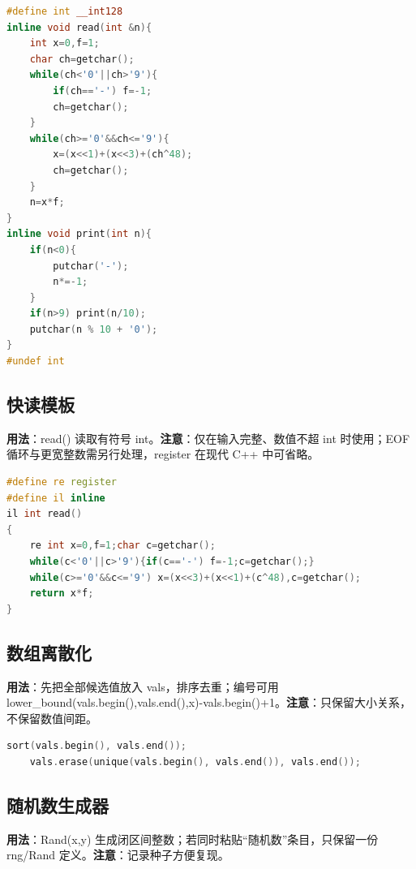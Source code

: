 \documentclass[a4paper,9pt]{extarticle}
\begin{document}
\begin{lstlisting}[language={C++}]
#define int __int128
inline void read(int &n){
    int x=0,f=1;
    char ch=getchar();
    while(ch<'0'||ch>'9'){
        if(ch=='-') f=-1;
        ch=getchar();
    }
    while(ch>='0'&&ch<='9'){
        x=(x<<1)+(x<<3)+(ch^48);
        ch=getchar();
    }
    n=x*f;
}
inline void print(int n){
    if(n<0){
        putchar('-');
        n*=-1;
    }
    if(n>9) print(n/10);
    putchar(n % 10 + '0');
}
#undef int
\end{lstlisting}

\subsection{快读模板}

\textbf{用法}：read() 读取有符号 int。\textbf{注意}：仅在输入完整、数值不超 int 时使用；EOF 循环与更宽整数需另行处理，register 在现代 C++ 中可省略。

\begin{lstlisting}[language={C++}]
#define re register
#define il inline
il int read()
{
    re int x=0,f=1;char c=getchar();
    while(c<'0'||c>'9'){if(c=='-') f=-1;c=getchar();}
    while(c>='0'&&c<='9') x=(x<<3)+(x<<1)+(c^48),c=getchar();
    return x*f;
}
\end{lstlisting}
\subsection{数组离散化}

\textbf{用法}：先把全部候选值放入 vals，排序去重；编号可用 lower\_\allowbreak{}bound(\allowbreak{}vals.\allowbreak{}begin(\allowbreak{})\allowbreak{},\allowbreak{}vals.\allowbreak{}end(\allowbreak{})\allowbreak{},\allowbreak{}x)\allowbreak{}-\allowbreak{}vals.\allowbreak{}begin(\allowbreak{})\allowbreak{}+\allowbreak{}1。\textbf{注意}：只保留大小关系，不保留数值间距。

\begin{lstlisting}[language={C++}]
    sort(vals.begin(), vals.end());
    vals.erase(unique(vals.begin(), vals.end()), vals.end());
\end{lstlisting}
\subsection{随机数生成器}

\textbf{用法}：Rand(x,y) 生成闭区间整数；若同时粘贴“随机数”条目，只保留一份 rng/\allowbreak{}Rand 定义。\textbf{注意}：记录种子方便复现。
\end{document}
